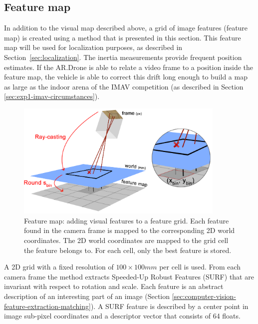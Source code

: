 		\subsection{Feature map}
\label{sec:feature_map}
In addition to the visual map described above, a grid of image features (feature map) is created using a method that is presented in this section.
This feature map will be used for localization purposes, as described in Section~\ref{sec:localization}.
The inertia measurements provide frequent position estimates.
If the AR.Drone is able to relate a video frame to a position inside the feature map, the vehicle is able to correct this drift long enough to build a map 
as large as the indoor arena of the IMAV competition (as described in Section \ref{sec:exp1-imav-circumstances}).

\begin{figure}[htb]
\centering
\includegraphics[width=10cm]{images/mapping3.png}
\caption{Feature map: adding visual features to a feature grid. Each feature found in the camera frame is mapped to the corresponding 2D world coordinates. The 2D world coordinates are mapped to the grid cell the feature belongs to. For each cell, only the best feature is stored.}
\label{fig:mapping3}
\end{figure}

A 2D grid with a fixed resolution of $100 \times 100mm$ per cell is used.
From each camera frame the method extracts Speeded-Up Robust Features (SURF) \cite{Bay2008cviu} that are invariant with respect to rotation and scale.
Each feature is an abstract description of an interesting part of an image (Section \ref{sec:computer-vision-feature-extraction-matching}).
A SURF feature is described by a center point in image sub-pixel coordinates and a descriptor vector that consists of 64 floats.

